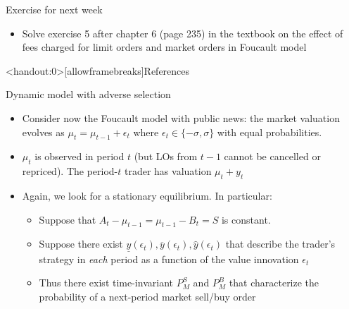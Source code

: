 \documentclass[english,10pt
,aspectratio=169
]{beamer}
\begin{document}
\begin{frame}{Exercise for next week}
	\begin{itemize}
		\item Solve exercise 5 after chapter 6 (page 235) in the textbook on the effect of fees charged for limit orders and market orders in Foucault model
	\end{itemize}
\end{frame}





\appendix
\begin{frame}<handout:0>[allowframebreaks]{References}


\end{frame}


\begin{frame}[label=adverse]{Dynamic model with adverse selection}
	\begin{itemize}
		\item Consider now the Foucault model with \alert{public news}:
		the market valuation evolves as $\mu_t = \mu_{t-1}+\epsilon_t$ where $\epsilon_t \in \{-\sigma, \sigma \}$ with equal probabilities.
		\item  $\mu_t$ is observed in period $t$ (but LOs from $t-1$ cannot be cancelled or repriced). The period-$t$ trader has valuation $\mu_t+y_t$
		\item Again, we look for a stationary equilibrium. In particular:
		\begin{itemize}
			\item Suppose that $A_t-\mu_{t-1}=\mu_{t-1}-B_t=S$ is constant.
			\item Suppose there exist $\underline{y}(\epsilon_t),\overline{y}(\epsilon_t),\hat{y}(\epsilon_t)$ that describe the trader's strategy in \textit{each} period  as a function of the value innovation $\epsilon_t$ 
			\item Thus there exist time-invariant $P^S_M$ and $P^B_M$ that characterize the probability of a next-period market sell/buy order 
		\end{itemize}
	\end{itemize}
\end{frame}
\end{document}
